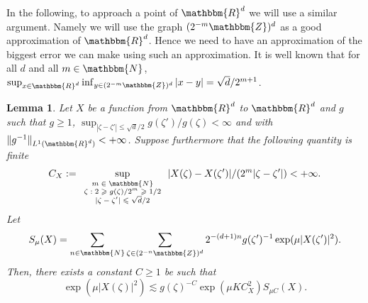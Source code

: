 \documentclass[a4paper,11pt]{article}
\newcommand{\assign}{:=}
\newcommand{\tmscript}[1]{\text{\scriptsize{$#1$}}}
\newtheorem{lemma}[theorem]{Lemma}
\begin{document}
In the following, to approach a point of $\mathbbm{R}^{d}$ we will use a
similar argument. Namely we will use the graph $( 2^{-m} \mathbbm{Z} )^{d}$ as
a good approximation of $\mathbbm{R}^{d}$. Hence we need to have an
approximation of the biggest error we can make using such an approximation. It
is well known that for all $d$ and all $m \in \mathbbm{N}$, $\sup_{x \in
\mathbbm{R}^{d}} \inf_{y \in ( 2^{-m} \mathbbm{Z} )^{d}} | x-y | = \sqrt{d}
/2^{m+1}$.

\begin{lemma}
  \label{lemma_chaining_space}Let $X$ be a function from $\mathbbm{R}^{d}$ to
  $\mathbbm{R}^{d}$ and $g$ such that $g \geqslant 1$, $\sup_{| \zeta - \zeta'
  | \leqslant \sqrt{d} /2} g ( \zeta' ) /g ( \zeta ) < \infty$ and with $\|
  g^{-1} \|_{L^{1} ( \mathbbm{R}^{d} )} <+ \infty$. Suppose furthermore that
  the following quantity is finite
  \[ C_{X} \assign \sup_{\tmscript{\begin{array}{c}
       m \in \mathbbm{N}\\
       \zeta : 2 \geqslant g ( \zeta ) /2^{m} \geqslant 1/2\\
       | \zeta - \zeta' | \leqslant \sqrt{d} /2
     \end{array}}} | X ( \zeta ) -X ( \zeta' ) | / ( 2^{m} | \zeta - \zeta' |
     ) <+ \infty . \]
  Let
  \[ S_{\mu} ( X ) = \sum_{n \in \mathbbm{N}} \sum_{\zeta \in ( 2^{-n}
     \mathbbm{Z} )^{d}} 2^{- ( d+1 ) n} g ( \zeta' )^{-1} \exp ( \mu | X (
     \zeta' ) |^{2} ) . \]
  Then, there exists a constant $C \geqslant 1$ be such that
  \[ \exp ( \mu | X ( \zeta ) |^{2} ) \lesssim g ( \zeta )^{-C} \exp ( \mu K
     C_{X}^{2} ) S_{\mu C} ( X ) . \]
\end{lemma}
\end{document}
